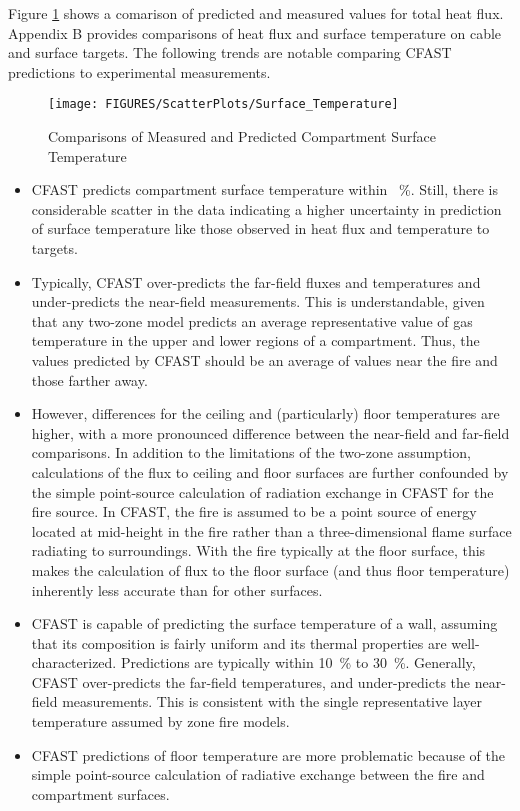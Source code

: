 Figure \ref{fig:Surface_Temperature_Scatter} shows a comarison of predicted and measured values for total heat flux. Appendix B provides comparisons of heat flux and surface temperature on cable and surface targets.  The following trends are notable comparing CFAST predictions to experimental measurements.
\label{Surface Temperature}
\label{Wall Temperature}
\label{Ceiling Temperature}
\label{Floor Temperature}

\begin{figure}
\begin{center}
\texttt{[image: FIGURES/ScatterPlots/Surface\_Temperature]}
\end{center}
\caption{Comparisons of Measured and Predicted  Compartment Surface Temperature} \label{fig:Surface_Temperature_Scatter}
\end{figure}

\begin{itemize}
\item CFAST predicts compartment surface temperature within \Surfacetempavg ~\%.  Still, there is considerable scatter in the data indicating a higher uncertainty in prediction of surface temperature  like those observed in heat flux and temperature to targets.
\item Typically, CFAST over-predicts the far-field fluxes and temperatures and under-predicts the near-field measurements.  This is understandable, given that any two-zone model predicts an average representative value of gas temperature in the upper and lower regions of a compartment.  Thus, the values predicted by CFAST should be an average of values near the fire and those farther away.
\item However, differences for the ceiling and (particularly) floor temperatures are higher, with a more pronounced difference between the near-field and far-field comparisons.  In addition to the limitations of the two-zone assumption, calculations of the flux to ceiling and floor surfaces are further confounded by the simple point-source calculation of radiation exchange in CFAST for the fire source.  In CFAST, the fire is assumed to be a point source of energy located at  mid-height in the fire rather than a three-dimensional flame surface radiating to surroundings.  With the fire typically at the floor surface, this makes the calculation of flux to the floor surface (and thus floor temperature) inherently less accurate than for other surfaces.
\item CFAST is capable of predicting the surface temperature of a wall, assuming that its composition is fairly uniform and its thermal properties are well-characterized.  Predictions are typically within 10~\% to 30~\%.  Generally, CFAST over-predicts the far-field temperatures, and under-predicts the near-field measurements.  This is consistent with the single representative layer temperature assumed by zone fire models.
\item CFAST predictions of floor temperature are more problematic because of the simple point-source calculation of radiative exchange between the fire and compartment surfaces.
\end{itemize}

